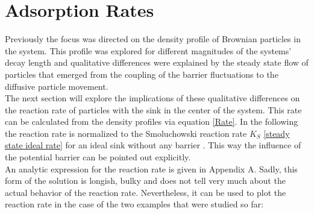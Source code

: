 \section{Adsorption Rates}
Previously the focus was directed on the density profile of Brownian particles in the system. This profile was explored for different magnitudes of the systems' decay length and qualitative differences were explained by the steady state flow of particles that emerged from the coupling of the barrier fluctuations to the diffusive particle movement.\\
The next section will explore the implications of these qualitative differences on the reaction rate of particles with the sink in the center of the system. This rate can be calculated from the density profiles via equation \eqref{Rate}. In the following the reaction rate is normalized to the Smoluchowski reaction rate $K_S$ \eqref{steady state ideal rate} for an ideal sink without any barrier . This way the influence of the potential barrier can be pointed out explicitly. \\
An analytic expression for the reaction rate is given in Appendix A.
Sadly, this form of the solution is longish, bulky and does not tell very much about the actual behavior of the reaction rate. Nevertheless, it can be used to plot the reaction rate in the case of the two examples that were studied so far: \\[-0.3 cm]
